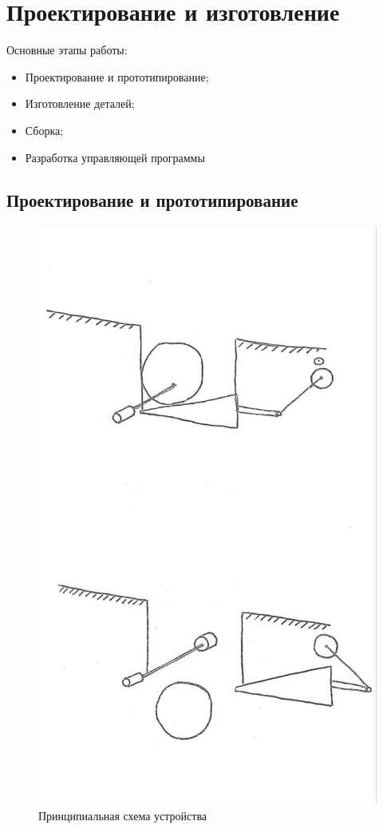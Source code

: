 \section {Проектирование и изготовление}

Основные этапы работы:

\begin{itemize}
	\item Проектирование и прототипирование; 
	\item Изготовление деталей;
	\item Сборка;
	\item Разработка управляющей программы
\end{itemize}

\subsection{Проектирование и прототипирование}

\begin{figure}[H]
	\centering
	\includegraphics[width=12cm]{scheme_idea.jpg}
	\caption{Принципиальная схема устройства}
	\label{ris:scheme_idea}
\end{figure}
\par\medskip

